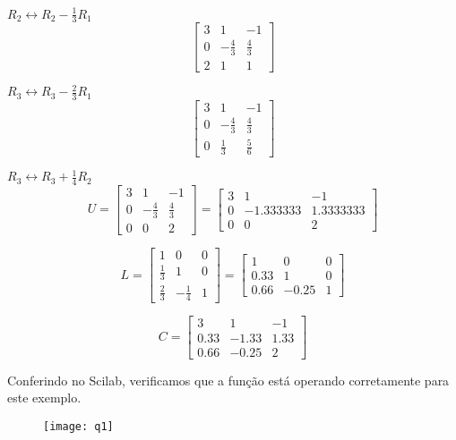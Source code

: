\documentclass[leqno]{article}
\numberwithin{equation}{section}
\begin{document}
\begin{enumerate}
\begin{sol}
		$R_2 \longleftrightarrow R_2 - \frac{1}{3}R_1$
			$$\begin{bmatrix}
				3 & 1 & -1 \\
				0 & -\frac{4}{3} & \frac{4}{3} \\
				2 & 1 & 1 
			\end{bmatrix}$$
		
		$R_3 \longleftrightarrow R_3 - \frac{2}{3}R_1$
			$$\begin{bmatrix}
				3 & 1 & -1 \\
				0 & -\frac{4}{3} & \frac{4}{3} \\
				0 & \frac{1}{3} & \frac{5}{6} 
			\end{bmatrix}$$
		
		$R_3 \longleftrightarrow R_3 + \frac{1}{4}R_2$
			$$U = \begin{bmatrix}
				3 & 1 & -1 \\
				0 & -\frac{4}{3} & \frac{4}{3} \\
				0 & 0 & 2
			\end{bmatrix} = \begin{bmatrix}
				3 & 1 & -1 \\
				0 & -1.333333 & 1.3333333 \\
				0 & 0 & 2
			\end{bmatrix}$$
		
			$$L = \begin{bmatrix}
				1 & 0 & 0 \\
				\frac{1}{3} & 1 & 0 \\
				\frac{2}{3} & -\frac{1}{4} & 1
			\end{bmatrix} = \begin{bmatrix}
			1 & 0 & 0 \\
			0.33 & 1 & 0 \\
			0.66 & -0.25 & 1
			\end{bmatrix}$$
		
			$$C = \begin{bmatrix}
				3 & 1 & -1 \\
				0.33 & -1.33 & 1.33 \\
				0.66 & -0.25 & 2
			\end{bmatrix} $$
		
	
		Conferindo no Scilab, verificamos que a função está operando corretamente para este exemplo.
		\begin{figure}[H]
			\centering
			\texttt{[image: q1]}
		\end{figure}
		
\end{sol}


\end{enumerate}
\end{document}
